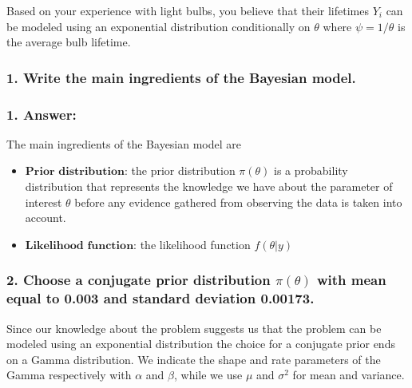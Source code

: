 \documentclass[
]{article}
\providecommand{\tightlist}{%
  \setlength{\itemsep}{0pt}\setlength{\parskip}{0pt}}
\begin{document}
Based on your experience with light bulbs, you believe that their
lifetimes \(Y_i\) can be modeled using an exponential distribution
conditionally on \(\theta\) where \(\psi = 1/\theta\) is the average
bulb lifetime.

\hypertarget{write-the-main-ingredients-of-the-bayesian-model.}{%
\subsubsection{1. Write the main ingredients of the Bayesian
model.}\label{write-the-main-ingredients-of-the-bayesian-model.}}

\hypertarget{answer-4}{%
\subsubsection{1. Answer:}\label{answer-4}}

The main ingredients of the Bayesian model are

\begin{itemize}
\tightlist
\item
  \(\textbf{Prior distribution}\): the prior distribution
  \(\pi(\theta)\) is a probability distribution that represents the
  knowledge we have about the parameter of interest \(\theta\) before
  any evidence gathered from observing the data is taken into account.
\item
  \(\textbf{Likelihood function}\): the likelihood function
  \(f(\theta | y)\)
\end{itemize}

\hypertarget{choose-a-conjugate-prior-distribution-pitheta-with-mean-equal-to-0.003-and-standard-deviation-0.00173.}{%
\subsubsection{\texorpdfstring{2. Choose a conjugate prior distribution
\(\pi(\theta)\) with mean equal to 0.003 and standard deviation
0.00173.}{2. Choose a conjugate prior distribution \textbackslash pi(\textbackslash theta) with mean equal to 0.003 and standard deviation 0.00173.}}\label{choose-a-conjugate-prior-distribution-pitheta-with-mean-equal-to-0.003-and-standard-deviation-0.00173.}}

Since our knowledge about the problem suggests us that the problem can
be modeled using an exponential distribution the choice for a conjugate
prior ends on a Gamma distribution. We indicate the shape and rate
parameters of the Gamma respectively with \(\alpha\) and \(\beta\),
while we use \(\mu\) and \(\sigma^2\) for mean and variance.
\end{document}
